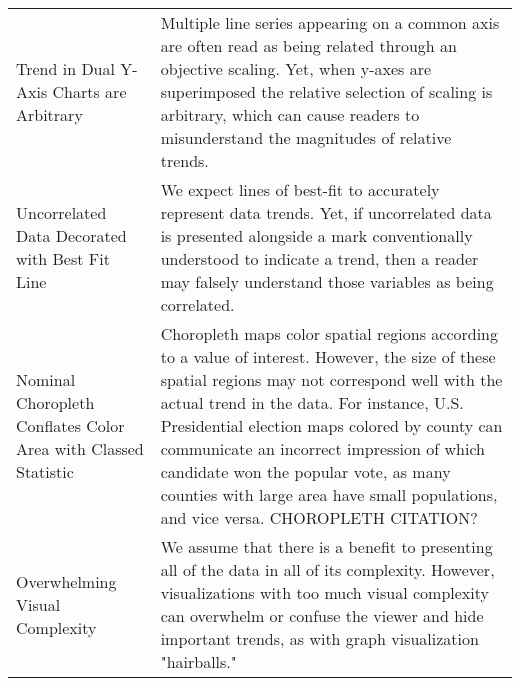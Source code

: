 \begin{longtable}{p{3cm}p{14cm}}
 \rowcolor{colorc-opaque}Trend in Dual Y-Axis Charts are Arbitrary  & Multiple line series appearing on a common axis are often read as being related through an objective scaling. Yet, when y-axes are superimposed the relative selection of scaling is arbitrary, which can cause readers to misunderstand the magnitudes of relative trends. \cite{KindlmannAlgebraicVisPedagogyPDV2016, cairo2015graphics}\\
 \rowcolor{colorc}Uncorrelated Data Decorated with Best Fit Line  & We expect lines of best-fit to accurately represent data trends. Yet, if uncorrelated data is presented alongside a mark conventionally understood to indicate a trend, then a reader may falsely understand those variables as being correlated.   \\
 \rowcolor{colorc-opaque}Nominal Choropleth Conflates Color Area with Classed Statistic & Choropleth maps color spatial regions according to a value of interest. However, the size of these spatial regions may not correspond well with the actual trend in the data. For instance, U.S. Presidential election maps colored by county can communicate an incorrect impression of which candidate won the popular vote, as many counties with large area have small populations, and vice versa. \cite{gastner2005maps} CHOROPLETH CITATION?\\
 \rowcolor{colorc}Overwhelming Visual Complexity & We assume that there is a benefit to presenting all of the data in all of its complexity. However, visualizations with too much visual complexity can overwhelm or confuse the viewer and hide important trends, as with graph visualization "hairballs." \cite{hofmann2012graphical, greadability}\\


\end{longtable}
